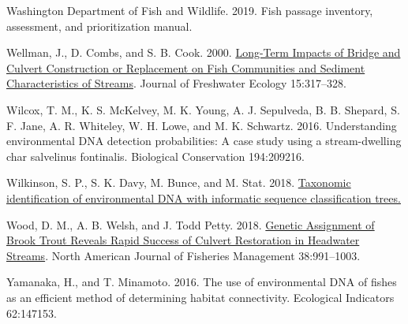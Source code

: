 \documentclass[
]{article}
\newlength{\cslhangindent}
\newlength{\cslentryspacingunit} %
\newenvironment{CSLReferences}[2] %
 {%
  \setlength{\parindent}{0pt}
  \ifodd #1
  \let\oldpar\par
  \def\par{\hangindent=\cslhangindent\oldpar}
  \fi
  \setlength{\parskip}{#2\cslentryspacingunit}
 }%
 {}
\begin{document}
\begin{CSLReferences}{1}{0}
\leavevmode{}%
Washington Department of Fish and Wildlife. 2019. Fish passage
inventory, assessment, and prioritization manual.

\leavevmode{}%
Wellman, J., D. Combs, and S. B. Cook. 2000.
\href{https://www.tandfonline.com/doi/epdf/10.1080/02705060.2000.9663750?needAccess=true\&role=button}{Long-Term
Impacts of Bridge and Culvert Construction or Replacement on Fish
Communities and Sediment Characteristics of Streams}. Journal of
Freshwater Ecology 15:317--328.

\leavevmode{}%
Wilcox, T. M., K. S. McKelvey, M. K. Young, A. J. Sepulveda, B. B.
Shepard, S. F. Jane, A. R. Whiteley, W. H. Lowe, and M. K. Schwartz.
2016. Understanding environmental DNA detection probabilities: A case
study using a stream-dwelling char salvelinus fontinalis. Biological
Conservation 194:209216.

\leavevmode{}%
Wilkinson, S. P., S. K. Davy, M. Bunce, and M. Stat. 2018.
\href{https://doi.org/10.7287/peerj.preprints.26812v1}{Taxonomic
identification of environmental DNA with informatic sequence
classification trees.}

\leavevmode{}%
Wood, D. M., A. B. Welsh, and J. Todd Petty. 2018.
\href{https://doi.org/10.1002/nafm.10185}{Genetic Assignment of Brook
Trout Reveals Rapid Success of Culvert Restoration in Headwater
Streams}. North American Journal of Fisheries Management 38:991--1003.

\leavevmode{}%
Yamanaka, H., and T. Minamoto. 2016. The use of environmental DNA of
fishes as an efficient method of determining habitat connectivity.
Ecological Indicators 62:147153.

\end{CSLReferences}
\end{document}
